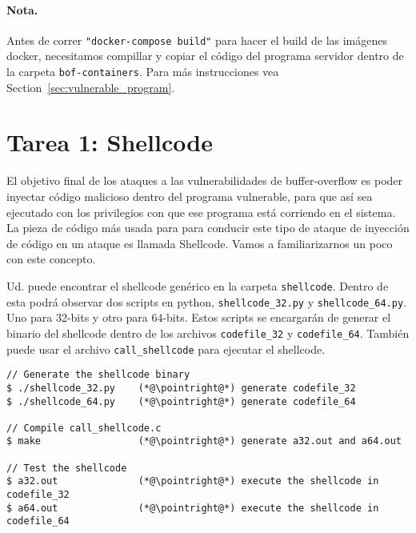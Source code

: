 


\paragraph{Nota.} Antes de correr \texttt{"docker-compose build"} para hacer el build de las imágenes docker, necesitamos compillar y copiar el código del programa servidor dentro de la carpeta \texttt{bof-containers}. Para más instrucciones vea Section~\ref{sec:vulnerable_program}.



\section{Tarea 1: Shellcode}
El objetivo final de los ataques a las vulnerabilidades de buffer-overflow es poder inyectar código malicioso dentro del programa vulnerable, para que así sea ejecutado con los privilegios con que ese programa está corriendo en el sistema.
La pieza de código más usada para para conducir este tipo de ataque de inyección de código en un ataque es llamada Shellcode.
Vamos a familiarizarnos un poco con este concepto.



Ud. puede encontrar el shellcode genérico en la carpeta \texttt{shellcode}.
Dentro de esta podrá observar dos scripts en python, \texttt{shellcode\_32.py} y \texttt{shellcode\_64.py}. 
Uno para 32-bits y otro para 64-bits.
Estos scripts se encargarán de generar el binario del shellcode dentro de los archivos \texttt{codefile\_32} y \texttt{codefile\_64}.
También puede usar el archivo \texttt{call\_shellcode} para ejecutar el shellcode. 


\newcommand{\pointright}{\ding{221}}

\begin{lstlisting}
// Generate the shellcode binary 
$ ./shellcode_32.py    (*@\pointright@*) generate codefile_32
$ ./shellcode_64.py    (*@\pointright@*) generate codefile_64

// Compile call_shellcode.c
$ make                 (*@\pointright@*) generate a32.out and a64.out 

// Test the shellcode 
$ a32.out              (*@\pointright@*) execute the shellcode in codefile_32
$ a64.out              (*@\pointright@*) execute the shellcode in codefile_64
\end{lstlisting}
 

